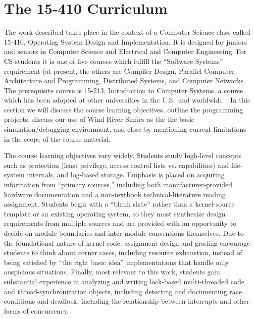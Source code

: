 \section{The 15-410 Curriculum}
\label{sec:curriculum}

The work described takes place in the context of a
Computer Science class called
15-410, Operating System Design and Implementation.
It is designed for juniors and seniors in Computer Science
and Electrical and Computer Engineering.
For CS students it is one of five courses which fulfill
the ``Software Systems'' requirement (at present, the others
are Compiler Design,
Parallel Computer Architecture and Programming,
Distributed Systems,
and Computer Networks.
The prerequisite course is 15-213,
Introduction to Computer Systems,
a course which has been adopted at other
universities in the U.S.\ and worldwide~\cite{sigcse01:CSaPP}.
In this section we will discuss the course learning
objectives,
outline the programming projects,
discuss our use of Wind River Simics as the
the basic simulation/debugging environment,
and close by mentioning current limitations in the scope
of the course material.

The course learning objectives vary widely.
%
Students study high-level concepts
such as protection (least privilege, access control lists vs.
capabilities)
and
file-system internals,
and log-based storage.
%
Emphasis is placed on acquiring information from ``primary sources,''
including both manufacturer-provided hardware documentation
and a non-textbook technical-literature reading assignment.
%
Students begin with a ``blank slate'' rather than a
kernel-source template or an existing operating system,
so they must synthesize design requirements from multiple sources
and are provided with an opportunity to 
decide on module boundaries and inter-module conventions
themselves.
%
Due to the foundational nature of kernel code,
assignment design and grading encourage students to
think about corner cases, including resource exhaustion,
instead of being satisfied by ``the right basic idea''
implementations that handle only auspicious situations.
%
Finally, most relevant to this work,
students gain substantial experience in
analyzing and writing lock-based multi-threaded code and
thread-synchronization objects, including detecting and documenting race conditions and deadlock,
including
the relationship between interrupts and other forms of concurrency.

